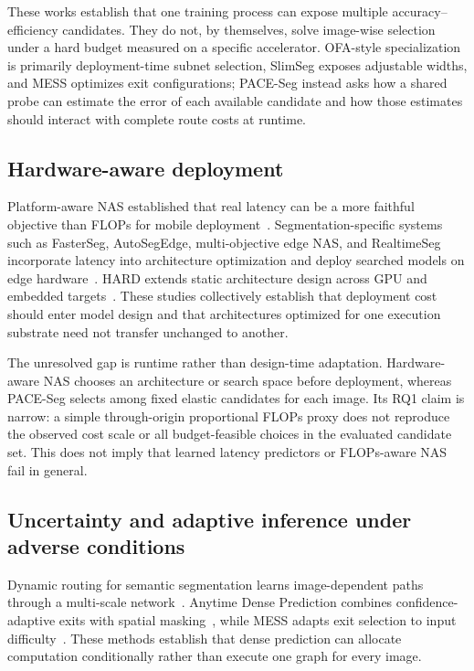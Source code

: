 \documentclass[a4paper,review,12pt]{elsarticle}
\newcommand{\method}{PACE-Seg}
\begin{document}
These works establish that one training process can expose multiple accuracy--efficiency candidates. They do not, by themselves, solve image-wise selection under a hard budget measured on a specific accelerator. OFA-style specialization is primarily deployment-time subnet selection, SlimSeg exposes adjustable widths, and MESS optimizes exit configurations; \method{} instead asks how a shared probe can estimate the error of each available candidate and how those estimates should interact with complete route costs at runtime.

\subsection{Hardware-aware deployment}

Platform-aware NAS established that real latency can be a more faithful objective than FLOPs for mobile deployment~\cite{tan2019mnasnet}. Segmentation-specific systems such as FasterSeg, AutoSegEdge, multi-objective edge NAS, and RealtimeSeg incorporate latency into architecture optimization and deploy searched models on edge hardware~\cite{chen2020fasterseg,dou2023autosegedge,dou2024multiobjective,li2023realtimeseg}. HARD extends static architecture design across GPU and embedded targets~\cite{kwon2024hard}. These studies collectively establish that deployment cost should enter model design and that architectures optimized for one execution substrate need not transfer unchanged to another.

The unresolved gap is runtime rather than design-time adaptation. Hardware-aware NAS chooses an architecture or search space before deployment, whereas \method{} selects among fixed elastic candidates for each image. Its RQ1 claim is narrow: a simple through-origin proportional FLOPs proxy does not reproduce the observed cost scale or all budget-feasible choices in the evaluated candidate set. This does not imply that learned latency predictors or FLOPs-aware NAS fail in general.

\subsection{Uncertainty and adaptive inference under adverse conditions}

Dynamic routing for semantic segmentation learns image-dependent paths through a multi-scale network~\cite{li2020dynamic}. Anytime Dense Prediction combines confidence-adaptive exits with spatial masking~\cite{liu2022anytime}, while MESS adapts exit selection to input difficulty~\cite{kouris2022mess}. These methods establish that dense prediction can allocate computation conditionally rather than execute one graph for every image.
\end{document}
